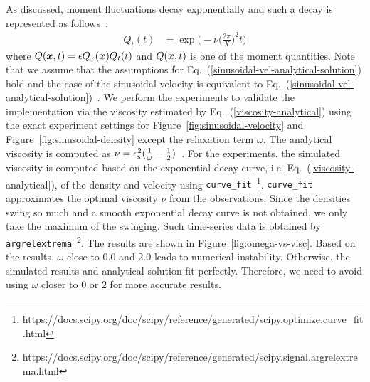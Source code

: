 As discussed, moment fluctuations decay exponentially and
such a decay is represented as follows~\cite{palmer1994transverse, hess2002determining}:
\begin{equation}
  \begin{aligned}
    Q_t(t) &= \exp\biggl(
      -\nu \biggl(
        \frac{2\pi}{X}
      \biggr)^2 t\biggr)
  \end{aligned}
  \label{viscosity-analytical}
\end{equation}
where $Q(\boldsymbol{x}, t) = \epsilon Q_x(\boldsymbol{x}) Q_t(t)$
and $Q(\boldsymbol{x}, t)$ is one of the moment quantities.
Note that we assume that the assumptions for Eq.~(\ref{sinusoidal-vel-analytical-solution}) hold
and the case of the sinusoidal velocity is equivalent to Eq.~(\ref{sinusoidal-vel-analytical-solution})~\cite{fei2018three}.
We perform the experiments to validate the implementation via the viscosity estimated by Eq.~(\ref{viscosity-analytical}) using
the exact experiment settings for Figure~\ref{fig:sinusoidal-velocity}
and Figure~\ref{fig:sinusoidal-density}
except the relaxation term $\omega$.
The analytical viscosity is computed as $\nu = c_{\rm s}^2 (\frac{1}{\omega} - \frac{1}{2})$~\cite{timm2016lattice}.
For the experiments, the simulated viscosity is computed based on the exponential decay curve, i.e. Eq.~(\ref{viscosity-analytical}),
of the density and velocity using 
{\tt curve\_fit}~\footnote{https://docs.scipy.org/doc/scipy/reference/generated/scipy.optimize.curve\_fit.html}.
{\tt curve\_fit} approximates the optimal viscosity $\nu$ from the observations.
Since the densities swing so much and a smooth exponential decay curve
is not obtained, we only take the maximum of the swinging.
Such time-series data is obtained by
{\tt argrelextrema}~\footnote{https://docs.scipy.org/doc/scipy/reference/generated/scipy.signal.argrelextrema.html}.
The results are shown in Figure~\ref{fig:omega-vs-visc}.
Based on the results, $\omega$ close to $0.0$ and $2.0$
leads to numerical instability.
Otherwise, the simulated results and analytical solution fit perfectly.
Therefore, we need to avoid using $\omega$ closer to $0$ or $2$ for more accurate results.

